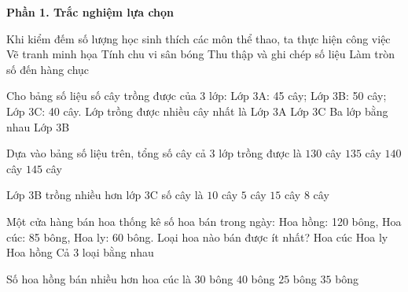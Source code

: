 \textbf{Phần 1. Trắc nghiệm lựa chọn}

\begin{ex} %
Khi kiểm đếm số lượng học sinh thích các môn thể thao, ta thực hiện công việc
\choice
{Vẽ tranh minh họa}
{Tính chu vi sân bóng}
{\True Thu thập và ghi chép số liệu}
{Làm tròn số đến hàng chục}
\end{ex}

\begin{ex} %
Cho bảng số liệu số cây trồng được của 3 lớp: Lớp 3A: 45 cây; Lớp 3B: 50 cây; Lớp 3C: 40 cây. Lớp trồng được nhiều cây nhất là
\choice
{Lớp 3A}
{Lớp 3C}
{Ba lớp bằng nhau}
{\True Lớp 3B}
\end{ex}

\begin{ex} %
Dựa vào bảng số liệu trên, tổng số cây cả 3 lớp trồng được là
\choice
{$130$ cây}
{\True $135$ cây}
{$140$ cây}
{$145$ cây}
\end{ex}

\begin{ex} %
Lớp 3B trồng nhiều hơn lớp 3C số cây là
\choice
{\True $10$ cây}
{$5$ cây}
{$15$ cây}
{$8$ cây}
\end{ex}

\begin{ex} %
Một cửa hàng bán hoa thống kê số hoa bán trong ngày: Hoa hồng: 120 bông, Hoa cúc: 85 bông, Hoa ly: 60 bông. Loại hoa nào bán được ít nhất?
\choice
{Hoa cúc}
{\True Hoa ly}
{Hoa hồng}
{Cả 3 loại bằng nhau}
\end{ex}

\begin{ex} %
Số hoa hồng bán nhiều hơn hoa cúc là
\choice
{$30$ bông}
{$40$ bông}
{$25$ bông}
{\True $35$ bông}
\end{ex}


